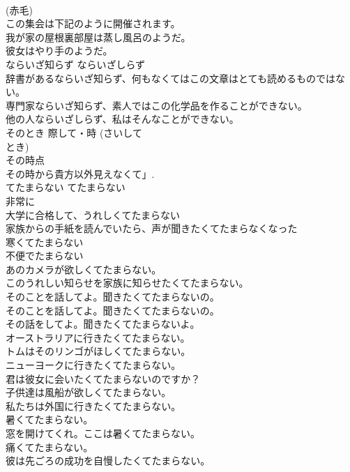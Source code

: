 \documentclass[8pt]{extreport}
\begin{document}
\begin{CJK}{UTF8}{min}
\\	(赤毛)
\\	この集会は下記のように開催されます。  
\\	我が家の屋根裏部屋は蒸し風呂のようだ。  
\\	彼女はやり手のようだ。  
\\	ならいざ知らず	ならいざしらず	
\\	辞書があるならいざ知らず、何もなくてはこの文章はとても読めるものではない。  
\\	専門家ならいざ知らず、素人ではこの化学品を作ることができない。  
\\	他の人ならいざしらず、私はそんなことができない。  
\\	そのとき	際して・時 (さいして 
\\	とき) 
\\	その時点	
\\	その時から貴方以外見えなくて」.  
\\	てたまらない	てたまらない	
\\	非常に	
\\	大学に合格して、うれしくてたまらない  
\\	家族からの手紙を読んでいたら、声が聞きたくてたまらなくなった  
\\	寒くてたまらない  
\\	不便でたまらない  
\\	あのカメラが欲しくてたまらない。  
\\	このうれしい知らせを家族に知らせたくてたまらない。  
\\	そのことを話してよ。聞きたくてたまらないの。  
\\	そのことを話してよ。聞きたくてたまらないの。  
\\	その話をしてよ。聞きたくてたまらないよ。  
\\	オーストラリアに行きたくてたまらない。  
\\	トムはそのリンゴがほしくてたまらない。  
\\	ニューヨークに行きたくてたまらない。  
\\	君は彼女に会いたくてたまらないのですか？  
\\	子供達は風船が欲しくてたまらない。  
\\	私たちは外国に行きたくてたまらない。  
\\	暑くてたまらない。  
\\	窓を開けてくれ。ここは暑くてたまらない。  
\\	痛くてたまらない。  
\\	彼は先ごろの成功を自慢したくてたまらない。  

\end{CJK}
\end{document}
